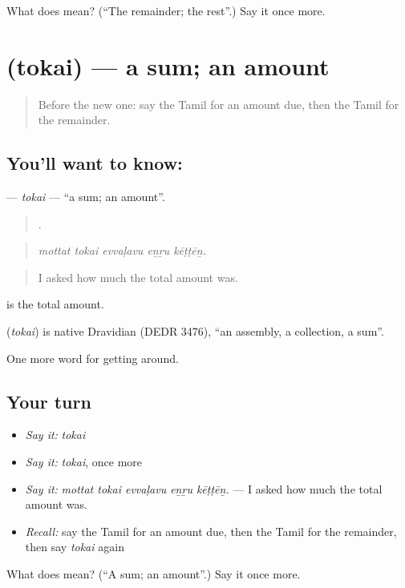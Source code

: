 \begin{tcolorbox}[breakable,colback=teal!4,colframe=teal!35!black,title={Before you move on}]
What does  mean? (\textquotedblleft{}The remainder; the rest\textquotedblright{}.) Say it once more.
\end{tcolorbox}
\section[\texorpdfstring{\ta{தொகை} (tokai)}{தொகை (tokai)}]{ (tokai) — a sum; an amount}

\label{lesson:TA-C447-tokai}



\begin{quote}
Before the new one: say the Tamil for an amount due, then the Tamil for the remainder.
\end{quote}

\subsection*{You'll want to know: }
\textbf{} — \emph{tokai} — \textquotedblleft{}a sum; an amount\textquotedblright{}.

\begin{quote}
    .
\end{quote}

\begin{quote}
\emph{mottat tokai evvaḷavu eṉṟu kēṭṭēṉ.}
\end{quote}

\begin{quote}
I asked how much the total amount was.
\end{quote}

  is the total amount.

\begin{cousinweb}
\textbf{} (\emph{tokai}) is native Dravidian (DEDR 3476), \textquotedblleft{}an assembly, a collection, a sum\textquotedblright{}.
\end{cousinweb}

\begin{grammarlens}[title={What you've built}]
One more word for getting around.
\end{grammarlens}

\subsection*{Your turn}
\begin{itemize}
\raggedright
  \item \emph{Say it:} \emph{tokai}
  \item \emph{Say it:} \emph{tokai}, once more
  \item \emph{Say it:} \emph{mottat tokai evvaḷavu eṉṟu kēṭṭēṉ.} — I asked how much the total amount was.
  \item \emph{Recall:} say the Tamil for an amount due, then the Tamil for the remainder, then say \emph{tokai} again
\end{itemize}

\begin{tcolorbox}[breakable,colback=teal!4,colframe=teal!35!black,title={Before you move on}]
What does  mean? (\textquotedblleft{}A sum; an amount\textquotedblright{}.) Say it once more.
\end{tcolorbox}
